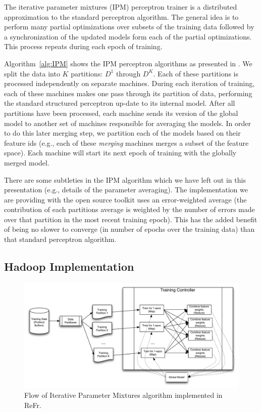 \documentclass[a4paper]{article}
\begin{document}
The iterative parameter mixtures (IPM) perceptron trainer is a distributed
approximation to the standard perceptron algorithm. The general idea
is to perform many partial optimizations over subsets of the training
data followed by a synchronization of the updated models form each of
the partial optimizations.  This process repeats during each epoch of training.

Algorithm~\ref{alg:IPM} shows the IPM perceptron algorithms as presented
in \cite{mcdonald10distributed}. We split the data into $K$
partitions: $D^{1}$ through $D^{K}$. Each of these
partitions is processed independently on separate machines. During each iteration
of training, each of these machines makes one pass through its partition
of data, performing the standard structured perceptron up-date to its internal
model.  After all partitions have been processed, each machine sends its
version of the global model to another set of machines responsible for averaging
the models.  In order to do this later
merging step, we partition each of the models based on their feature ids (e.g.,
each of these \emph{merging} machines merges a subset of the feature space).
Each machine will start its next epoch of training with the globally merged
model.

There are some subtleties in the IPM algorithm which we have left out
in this presentation (e.g., details of the parameter averaging).
The implementation we are providing with the open source toolkit uses
an error-weighted average (the contribution of each partitions
average is weighted by the number of errors made over that partition in the most
recent training epoch).  This has the added benefit of being no slower to
converge (in number of epochs over the training data) than that standard
perceptron algorithm.

\subsection{Hadoop Implementation}
\begin{figure}[th]
\centering \includegraphics[width=.5\textwidth]{graphics/mapreduceflow} 
\caption{\label{fig:hadoopipm}Flow of Iterative Parameter Mixtures algorithm implemented in {ReFr}.}
\end{figure}
\end{document}
